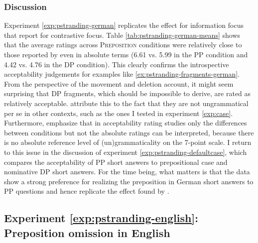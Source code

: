 \subsubsection{Discussion}
Experiment \ref{exp:pstranding-german} replicates the effect for information focus that \citet{merchant.etal2013} report for contrastive focus. Table \ref{tab:pstranding-german-means} shows that the average ratings across \textsc{Preposition} conditions were relatively close to those reported by \citet{merchant.etal2013} even in absolute terms (6.61 vs. 5.99 in the PP condition and 4.42 vs. 4.76 in the DP condition). This clearly confirms the introspective acceptability judgements for examples like \ref{ex:pstranding-fragments-german}. From the perspective of the movement and deletion account, it might seem surprising that DP fragments, which should be impossible to derive, are rated as relatively acceptable. \citet{merchant.etal2013} attribute this to the fact that they are not ungrammatical per se in other contexts, such as the ones I tested in experiment \ref{exp:case}. Furthermore, \citet{merchant.etal2013} emphasize that in acceptability rating studies only the differences between conditions but not the absolute ratings can be interpreted, because there is no absolute reference level of (un)grammaticality on the 7-point scale. 
I return to this issue in the discussion of experiment \ref{exp:pstranding-defaultcase}, which compares the acceptability of PP short answers to prepositional case and nominative DP short answers. For the time being, what matters is that the data show a strong preference for realizing the preposition in German short answers to PP questions and hence replicate the effect found by \citet{merchant.etal2013}.

\label{exp:pstranding-english}
\subsection{Experiment \ref{exp:pstranding-english}: Preposition omission in English} \label{sec:pstranding-english}

